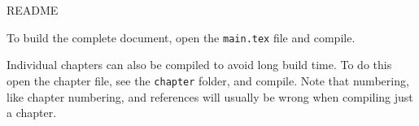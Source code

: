 \documentclass[a4paper,11pt,oneside]{article}
\begin{document}
{\Large README}

To build the complete document, open the \texttt{main.tex} file and compile.

Individual chapters can also be compiled to avoid long build time. To do this open the chapter file, see the \texttt{chapter} folder, and compile. Note that numbering, like chapter numbering, and references will usually be wrong when compiling just a chapter.
\end{document}
